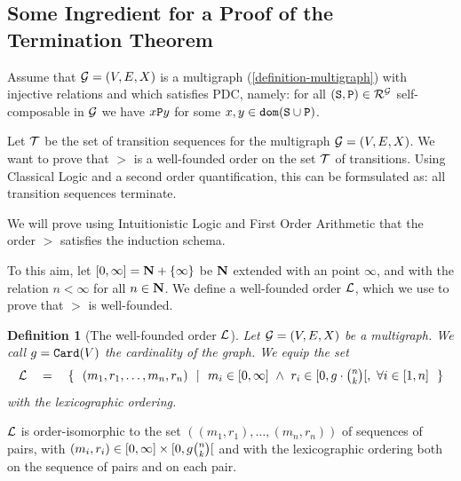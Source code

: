 \documentclass{lmcs}
\newtheorem{definition}[theorem]{Definition}
\begin{document}


\subsection{Some Ingredient for a Proof of the Termination Theorem}
\label{subsection-proof-termination}
Assume that ${\mathcal G}=(V,E,X)$ is a multigraph (\ref{definition-multigraph})
with injective relations and which
satisfies PDC, namely: for all $({\tt S},{\tt P}) \in {\mathcal R}^{\mathcal G}$ self-composable
in ${\mathcal G}$ we have $x {\tt P} y$ for some $x, y \in {\tt dom}({\tt S} \cup {\tt P})$.

Let ${\mathcal T}$ be the set of transition sequences for the multigraph ${\mathcal G}=(V,E,X)$. 
We want to prove that $>$ is a well-founded order on the set ${\mathcal T}$ of transitions. 
Using Classical Logic and a second order quantification,
this can be formsulated as: all transition sequences terminate.

We will prove using Intuitionistic Logic  and First Order Arithmetic
that the order $>$ satisfies the induction schema. 

To this aim, let $[0,\infty] = {\bf N} + \{\infty\}$ be ${\bf N}$ extended with an
 point $\infty$, and with the relation $n < \infty$
for all $n \in {\bf N}$. We define a well-founded order ${\mathcal L}$, which we use to prove
that $>$ is well-founded.

\begin{definition}[The well-founded order ${\mathcal L}$]
\label{definition-well-founded-order-L}
Let ${\mathcal G}=(V,E,X)$ be a multigraph. We call $g = {\tt Card}(V)$ the cardinality of the graph. 
We equip the set 
$$
\setL 
\ \ \ = \ \ \ 
\{ \ \ 
(m_1,r_1, \ldots, m_n,r_n)
  \ \  | \ \ 
    m_i \in [0,\infty] \ \wedge \ r_i \in [0, g \cdot \newton{n}{k}[, \ \forall i \in [1,n]
\ \ \}
$$
with the lexicographic ordering. 
\end{definition}

${\mathcal L}$ is order-isomorphic to the set $((m_1,r_1), \ldots, 
(m_n,r_n))$ of sequences of pairs, with
$(m_i,r_i) \in [0,\infty] \times [0,g \newton{n}{k}[$ and with
the lexicographic ordering both on the sequence of pairs and on each pair.

%
\end{document}
